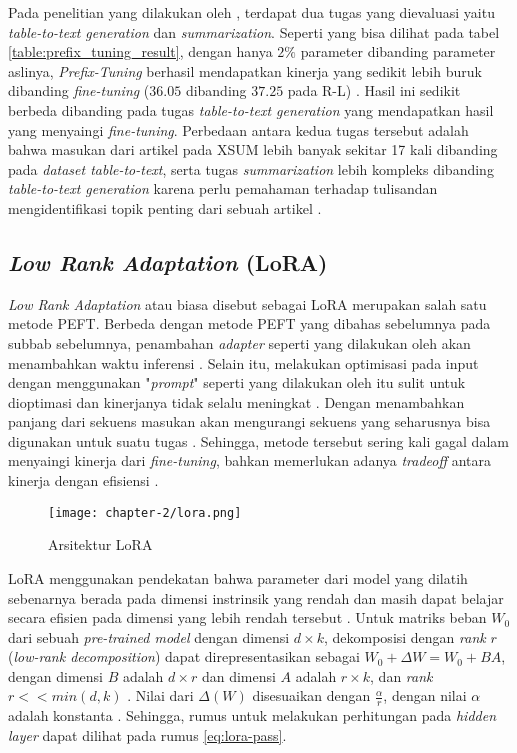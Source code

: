Pada penelitian yang dilakukan oleh \citeauthor{prefix_tuning}, terdapat dua tugas yang dievaluasi yaitu \textit{table-to-text generation} dan \textit{summarization}. Seperti yang bisa dilihat pada tabel \ref{table:prefix_tuning_result}, dengan hanya $2\%$ parameter dibanding parameter aslinya, \textit{Prefix-Tuning} berhasil mendapatkan kinerja yang sedikit lebih buruk dibanding \textit{fine-tuning} ($36.05$ dibanding $37.25$ pada R-L) \parencite{prefix_tuning}. Hasil ini sedikit berbeda dibanding pada tugas \textit{table-to-text generation} yang mendapatkan hasil yang menyaingi \textit{fine-tuning}. Perbedaan antara kedua tugas tersebut adalah bahwa masukan dari artikel pada XSUM lebih banyak sekitar 17 kali dibanding pada \textit{dataset table-to-text}, serta tugas \textit{summarization} lebih kompleks dibanding \textit{table-to-text generation} karena perlu pemahaman terhadap tulisandan mengidentifikasi topik penting dari sebuah artikel \parencite{prefix_tuning}.

\subsection{\textit{Low Rank Adaptation} (LoRA)}

\textit{Low Rank Adaptation} atau biasa disebut sebagai LoRA merupakan salah satu metode PEFT. Berbeda dengan metode PEFT yang dibahas sebelumnya pada subbab sebelumnya, penambahan \textit{adapter} seperti yang dilakukan oleh \citeauthor{adapter_houlsby} akan menambahkan waktu inferensi \parencite{lora}. Selain itu, melakukan optimisasi pada input dengan menggunakan "\textit{prompt}" seperti yang dilakukan oleh \citeauthor{prefix_tuning} itu sulit untuk dioptimasi dan kinerjanya tidak selalu meningkat \parencite{lora}. Dengan menambahkan panjang dari sekuens masukan akan mengurangi sekuens yang seharusnya bisa digunakan untuk suatu tugas \parencite{lora}. Sehingga, metode tersebut sering kali gagal dalam menyaingi kinerja dari \textit{fine-tuning}, bahkan memerlukan adanya \textit{tradeoff} antara kinerja dengan efisiensi \parencite{lora}.

\begin{figure}[h]
    \vspace{0.25cm}
    \centering
    \texttt{[image: chapter-2/lora.png]}
    \caption{Arsitektur LoRA \parencite{lora}}
    \label{fig:lora_arch}
\end{figure}

LoRA menggunakan pendekatan bahwa parameter dari model yang dilatih sebenarnya berada pada dimensi instrinsik yang rendah dan masih dapat belajar secara efisien pada dimensi yang lebih rendah tersebut \parencite{lora}. Untuk matriks beban $W_0$ dari sebuah \textit{pre-trained model} dengan dimensi $d\times{k}$, dekomposisi dengan \textit{rank} $r$ (\textit{low-rank decomposition}) dapat direpresentasikan sebagai $W_0 + \Delta{W} = W_0 + BA$, dengan dimensi $B$ adalah $d\times{r}$ dan dimensi $A$ adalah $r\times{k}$, dan \textit{rank} $r << min(d,k)$ \parencite{lora}. Nilai dari $\Delta(W)$ disesuaikan dengan $\frac{\alpha}{r}$, dengan nilai $\alpha$ adalah konstanta \parencite{lora}. Sehingga, rumus untuk melakukan perhitungan pada \textit{hidden layer} dapat dilihat pada rumus \ref{eq:lora-pass}.

